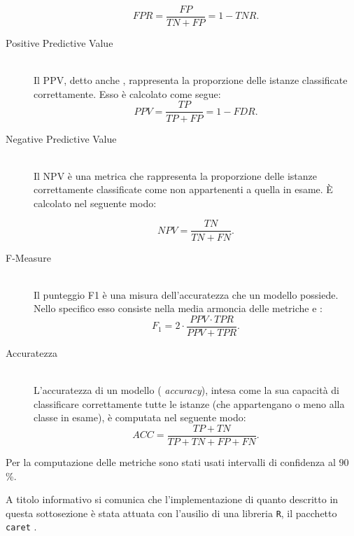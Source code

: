 \begin{description}
	\[FPR = \frac{FP}{TN + FP} = 1 - TNR\text{.}\]
	\item[Positive Predictive Value] \hfill \\
	Il \acf{PPV}, detto anche \emph{}, rappresenta la proporzione delle istanze classificate correttamente. Esso è calcolato come segue:
	\[PPV = \frac{TP}{TP + FP} = 1 - FDR\text{.}\]
	\item[Negative Predictive Value] \hfill \\
	Il \acf{NPV} è una metrica che rappresenta la proporzione delle istanze correttamente classificate come non appartenenti a quella in esame. \`E calcolato nel seguente modo:\par
	\[NPV = \frac{TN}{TN + FN}\text{.}\]
	\item[F-Measure] \hfill \\
	Il punteggio \acf{F1} è una misura dell'accuratezza che un modello possiede. Nello specifico esso consiste nella media armoncia delle metriche \emph{} e \emph{}:
	\[F_1 = 2 \cdot \frac{PPV \cdot TPR}{PPV + TPR}\text{.}\]
	\item[Accuratezza] \hfill \\
	L'accuratezza di un modello (\ie{} \emph{accuracy}), intesa come la sua capacità di classificare correttamente tutte le istanze (che appartengano o meno alla classe in esame), è computata nel seguente modo:
	\[ACC = \frac{TP + TN}{TP + TN + FP + FN}\text{.}\]
\end{description}
Per la computazione delle metriche sono stati usati intervalli di confidenza al $90$\%.

A titolo informativo si comunica che l'implementazione di quanto descritto in questa sottosezione è stata attuata con l'ausilio di una libreria \lstinline$R$, il pacchetto \lstinline$caret$ \citep{CARET2013}.

